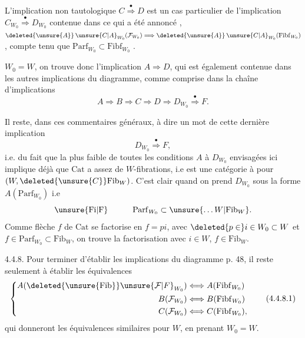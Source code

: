 L'implication non tautologique $C\overset{\bullet}{\Longrightarrow}D$ est un cas particulier de l'implication $C_{W_0}\overset{\bullet}{\Longrightarrow}D_{W_0}$   contenue dans ce qui a été annoncé  ,   $\deleted{\unsure{A}}\,\unsure{C|A}_{W_0}(\mathcal{F}_{W_0})\Longrightarrow \deleted{\unsure{A}}\,\unsure{C|A}_{W_0}(\mathrm{Fibf}_{W_0})$, 
compte tenu que $\mathrm{Parf}_{W_0}\subset\mathrm{Fibf}_{W_0}$ . 
\scanpage{326}\mspage{50}

$W_0=W$, on trouve donc l'implication $A\Longrightarrow D$, qui est  également contenue dans les autres implications du diagramme, comme comprise dans la chaîne d'implications
\[
 A\Longrightarrow B\Longrightarrow C\Longrightarrow D\Longrightarrow D_{W_0}
 \overset{\bullet}{\Longrightarrow}F.
\]

Il reste, dans ces commentaires généraux, à dire un mot de cette dernière implication
\[
 D_{W_0}\overset{\bullet}{\Longrightarrow}F,
\]
i.e. du fait que la plus faible de toutes les  conditions  $A$ à $D_{W_0}$ envisagées ici  implique déjà que $\mathrm{Cat}$ a assez de $W$-fibrations, i.e est une catégorie à  pour $(W,\deleted{\unsure{C}}\mathrm{Fib}_{W})$. C'est clair quand on prend $D_{W_0}$ sous la forme $A(\mathrm{Parf}_{W_0})$ i.e
\[
 \unsure{\mathrm{Fi}|\mathrm{F}}\hspace{3em}\mathrm{Parf}_{W_0}\subset\unsure{\ldots W|\mathrm{Fib}_{W}}.
\]
Comme  flèche $f$ de $\mathrm{Cat}$ se factorise en $f=pi$, avec $\deleted{p\in}i\in W_0\subset W$ et $f\in\mathrm{Parf}_{W_0}\subset\mathrm{Fib}_{W}$, on trouve la factorisation avec $i\in W$, $f\in\mathrm{Fib}_{W}$.
\scanpage{327}\mspage{51}

4.4.8. Pour terminer d'établir les implications du diagramme p. 48, il reste seulement à établir les équivalences
\[
 \left\{\begin{aligned}
 A(\deleted{\unsure{\mathrm{Fib}}}\unsure{\mathcal{F}|F}_{W_0})&\Longleftrightarrow A(\mathrm{Fibf}_{W_0})\\
 B(\mathcal{F}_{W_0})&\Longleftrightarrow B(\mathrm{Fibf}_{W_0})\\
 C(\mathcal{F}_{W_0})&\Longleftrightarrow C(\mathrm{Fibf}_{W_0}),
 \end{aligned}\right. \tag*{(4.4.8.1)}
\]
qui donneront les équivalences similaires pour $W$, en prenant $W_0=W$.

